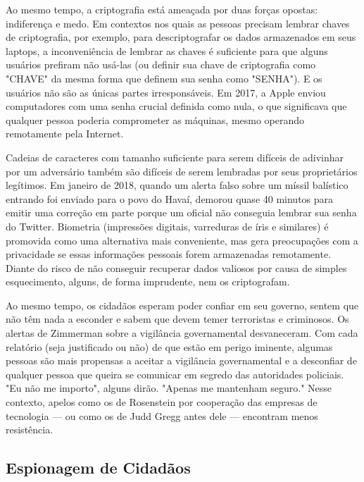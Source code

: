 \documentclass{book}
\begin{document}
Ao mesmo tempo, a criptografia está ameaçada por duas forças opostas: indiferença e medo. Em contextos nos quais as pessoas precisam lembrar chaves de criptografia, por exemplo, para descriptografar os dados armazenados em seus laptops, a inconveniência de lembrar as chaves é suficiente para que alguns usuários prefiram não usá-las (ou definir sua chave de criptografia como "CHAVE" da mesma forma que definem sua senha como "SENHA"). E os usuários não são as únicas partes irresponsáveis. Em 2017, a Apple enviou computadores com uma senha crucial definida como nula, o que significava que qualquer pessoa poderia comprometer as máquinas, mesmo operando remotamente pela Internet.

Cadeias de caracteres com tamanho suficiente para serem difíceis de adivinhar por um adversário também são difíceis de serem lembradas por seus proprietários legítimos. Em janeiro de 2018, quando um alerta falso sobre um míssil balístico entrando foi enviado para o povo do Havaí, demorou quase 40 minutos para emitir uma correção em parte porque um oficial não conseguia lembrar sua senha do Twitter. Biometria (impressões digitais, varreduras de íris e similares) é promovida como uma alternativa mais conveniente, mas gera preocupações com a privacidade se essas informações pessoais forem armazenadas remotamente. Diante do risco de não conseguir recuperar dados valiosos por causa de simples esquecimento, alguns, de forma imprudente, nem os criptografam.

Ao mesmo tempo, os cidadãos esperam poder confiar em seu governo, sentem que não têm nada a esconder e sabem que devem temer terroristas e criminosos. Os alertas de Zimmerman sobre a vigilância governamental desvaneceram. Com cada relatório (seja justificado ou não) de que estão em perigo iminente, algumas pessoas são mais propensas a aceitar a vigilância governamental e a desconfiar de qualquer pessoa que queira se comunicar em segredo das autoridades policiais. "Eu não me importo", alguns dirão. "Apenas me mantenham seguro." Nesse contexto, apelos como os de Rosenstein por cooperação das empresas de tecnologia — ou como os de Judd Gregg antes dele — encontram menos resistência.

\subsection{Espionagem de Cidadãos}
\label{}
\end{document}

